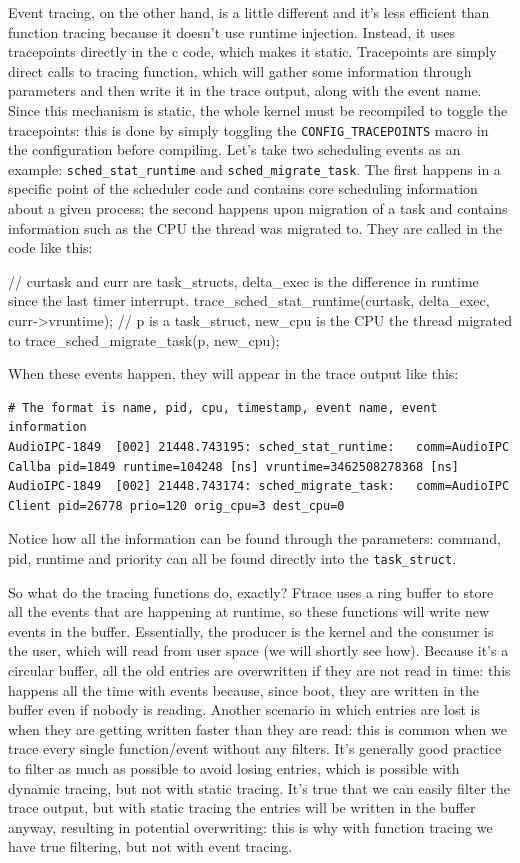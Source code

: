 \documentclass[10pt, oneside]{book}
\begin{document}
Event tracing, on the other hand, is a little different and it's less efficient than function tracing because it doesn't use runtime injection. Instead, it uses tracepoints directly in the c code, which makes it static. Tracepoints are simply direct calls to tracing function, which will gather some information through parameters and then write it in the trace output, along with the event name. Since this mechanism is static, the whole kernel must be recompiled to toggle the tracepoints: this is done by simply toggling the \verb|CONFIG_TRACEPOINTS| macro in the configuration before compiling. Let's take two scheduling events as an example: \verb|sched_stat_runtime| and \verb|sched_migrate_task|. The first happens in a specific point of the scheduler code and contains core scheduling information about a given process; the second happens upon migration of a task and contains information such as the CPU the thread was migrated to. They are called in the code like this:
\begin{code}
// curtask and curr are task_structs, delta_exec is the difference in runtime since the last timer interrupt. 
trace_sched_stat_runtime(curtask, delta_exec, curr->vruntime);
// p is a task_struct, new_cpu is the CPU the thread migrated to
trace_sched_migrate_task(p, new_cpu);
\end{code}
When these events happen, they will appear in the trace output like this:
\begin{Verbatim}[xleftmargin=-2cm,fontsize=\footnotesize]
# The format is name, pid, cpu, timestamp, event name, event information 
AudioIPC-1849  [002] 21448.743195: sched_stat_runtime:   comm=AudioIPC Callba pid=1849 runtime=104248 [ns] vruntime=3462508278368 [ns]
AudioIPC-1849  [002] 21448.743174: sched_migrate_task:   comm=AudioIPC Client pid=26778 prio=120 orig_cpu=3 dest_cpu=0
\end{Verbatim} 

Notice how all the information can be found through the parameters: command, pid, runtime and priority can all be found directly into the \verb|task_struct|.

So what do the tracing functions do, exactly? Ftrace uses a ring buffer to store all the events that are happening at runtime, so these functions will write new events in the buffer. Essentially, the producer is the kernel and the consumer is the user, which will read from user space (we will shortly see how). Because it's a circular buffer, all the old entries are overwritten if they are not read in time: this happens all the time with events because, since boot, they are written in the buffer even if nobody is reading. Another scenario in which entries are lost is when they are getting written faster than they are read: this is common when we trace every single function/event without any filters. It's generally good practice to filter as much as possible to avoid losing entries, which is possible with dynamic tracing, but not with static tracing. It's true that we can easily filter the trace output, but with static tracing the entries will be written in the buffer anyway, resulting in potential overwriting: this is why with function tracing we have true filtering, but not with event tracing.
\end{document}
